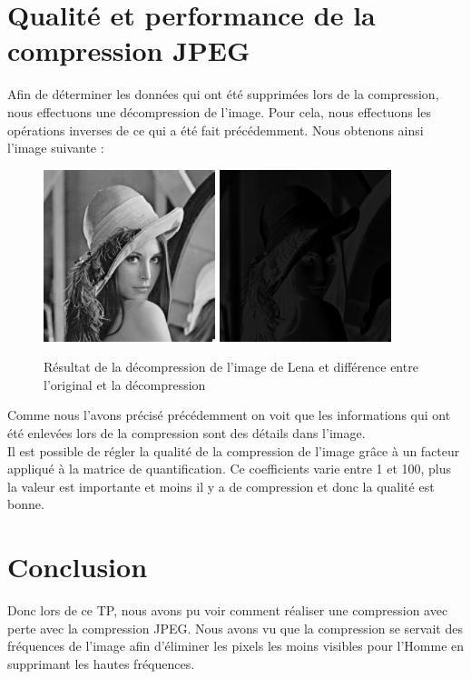 \documentclass[a4paper,11pt]{article}
\begin{document}
  \section{Qualité et performance de la compression JPEG}
  Afin de déterminer les données qui ont été supprimées lors de la compression, nous effectuons une décompression de l'image.
  Pour cela, nous effectuons les opérations inverses de ce qui a été fait précédemment. Nous obtenons ainsi l'image suivante :
  \begin{figure}[H]
    \center
   \includegraphics[width=5cm]{../result_lena.png}
   \includegraphics[width=5cm]{../diff_lena.png}
   \caption{Résultat de la décompression de l'image de Lena et différence entre l'original et la décompression}
  \end{figure}
  
  Comme nous l'avons précisé précédemment on voit que les informations qui ont été enlevées lors de la compression sont 
  des détails dans l'image.\\
  
  Il est possible de régler la qualité de la compression de l'image grâce à un facteur appliqué à la matrice de quantification.
  Ce coefficients varie entre 1 et 100, plus la valeur est importante et moins il y a de compression et donc la qualité est bonne.\\
  
  
  \section{Conclusion}
  Donc lors de ce TP, nous avons pu voir comment réaliser une compression avec perte avec la compression JPEG. Nous avons vu
  que la compression se servait des fréquences de l'image afin d'éliminer les pixels les moins visibles pour l'Homme en supprimant
  les hautes fréquences.
  
\end{document}
